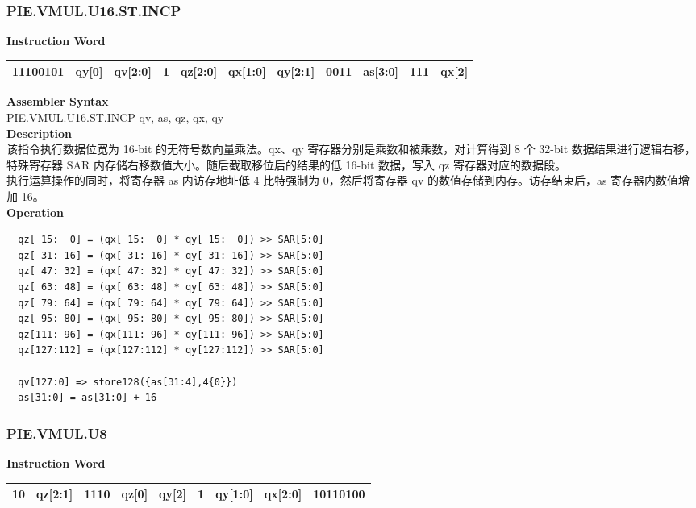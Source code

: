 \newpage
\subsubsection{PIE.VMUL.U16.ST.INCP}\label{instruction:PIEVMULU16STINCP}
\setlength\tabcolsep{6pt}
\textbf{Instruction Word} \\
\begin{tabular}{|c|c|c|c|c|c|c|c|c|c|c|}
	\hline
	11100101 & qy[0] & qv[2:0] & 1 & qz[2:0] & qx[1:0] & qy[2:1] & 0011 & as[3:0] & 111 & qx[2] \\
	\hline
\end{tabular}

\textbf{Assembler Syntax} \\
PIE.VMUL.U16.ST.INCP qv, as, qz, qx, qy \\
\textbf{Description} \\
该指令执行数据位宽为 16-bit 的无符号数向量乘法。qx、qy 寄存器分别是乘数和被乘数，对计算得到 8 个 32-bit 数据结果进行逻辑右移，特殊寄存器 SAR 内存储右移数值大小。随后截取移位后的结果的低 16-bit 数据，写入 qz 寄存器对应的数据段。\\ 执行运算操作的同时，将寄存器 as 内访存地址低 4 比特强制为 0，然后将寄存器 qv 的数值存储到内存。访存结束后，as 寄存器内数值增加 16。\\
\textbf{Operation}
\begin{lstlisting}
  qz[ 15:  0] = (qx[ 15:  0] * qy[ 15:  0]) >> SAR[5:0]
  qz[ 31: 16] = (qx[ 31: 16] * qy[ 31: 16]) >> SAR[5:0]
  qz[ 47: 32] = (qx[ 47: 32] * qy[ 47: 32]) >> SAR[5:0]
  qz[ 63: 48] = (qx[ 63: 48] * qy[ 63: 48]) >> SAR[5:0]
  qz[ 79: 64] = (qx[ 79: 64] * qy[ 79: 64]) >> SAR[5:0]
  qz[ 95: 80] = (qx[ 95: 80] * qy[ 95: 80]) >> SAR[5:0]
  qz[111: 96] = (qx[111: 96] * qy[111: 96]) >> SAR[5:0]
  qz[127:112] = (qx[127:112] * qy[127:112]) >> SAR[5:0]

  qv[127:0] => store128({as[31:4],4{0}})
  as[31:0] = as[31:0] + 16
\end{lstlisting}

\newpage
\subsubsection{PIE.VMUL.U8}\label{instruction:PIEVMULU8}
\setlength\tabcolsep{6pt}
\textbf{Instruction Word} \\
\begin{tabular}{|c|c|c|c|c|c|c|c|c|}
	\hline
	10 & qz[2:1] & 1110 & qz[0] & qy[2] & 1 & qy[1:0] & qx[2:0] & 10110100 \\
	\hline
\end{tabular}

